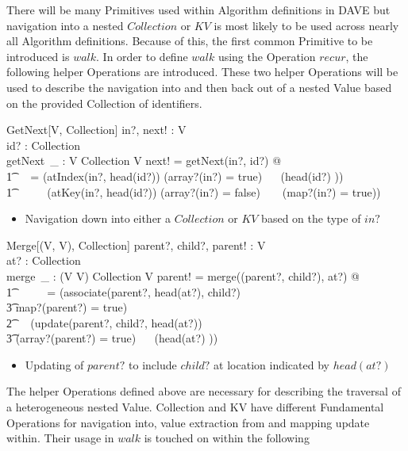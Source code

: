 \documentclass[../main.tex]{subfiles}
\begin{document}
There will be many Primitives used within Algorithm definitions in DAVE but
navigation into a nested $Collection$ or $KV$ is most likely to be used
across nearly all Algorithm definitions. Because of this, the first
common Primitive to be introduced is $walk$. In order to define $walk$
using the Operation $recur$, the following helper Operations are introduced.
These two helper Operations will be used to describe the navigation
into and then back out of a nested Value based on the provided
Collection of identifiers.
\begin{schema}{GetNext[V, Collection]}
  in?, next! : V \\
  id? : Collection \\
  getNext~\_ : V \cross Collection \surj V
  \where
  next! = getNext(in?, id?) @\\
  \t1 \ ~  = (atIndex(in?, head(id?)) \iff (array?(in?) = true) ~\land~ (head(id?) \in \nat)) ~\lor \\
  \t1 \ \ \ \ ~ (atKey(in?, head(id?)) \iff (array?(in?) = false) ~ \land ~ (map?(in?) = true))
\end{schema}
\begin{itemize}
  \item Navigation down into either a $Collection$ or $KV$ based on the type of $in?$
\end{itemize}
\begin{schema}{Merge[(V, V), Collection]}
  parent?, child?, parent! : V \\
  at? : Collection \\
  merge~\_ : (V \cross V) \cross Collection \bij V
  \where
  parent! = merge((parent?, child?), at?) @ \\
  \t1 \ \ \ \ ~ = (associate(parent?, head(at?), child?) \\
  \t3 \iff map?(parent?) = true) ~ \lor \\
  \t2 \ ~ (update(parent?, child?, head(at?)) \\
  \t3 \iff (array?(parent?) = true) ~\land~ (head(at?) \in \nat))
\end{schema}
\begin{itemize}
  \item Updating of $parent?$ to include $child?$ at location indicated by $head(at?)$
\end{itemize}
The helper Operations defined above are necessary for describing
the traversal of a heterogeneous nested Value. Collection and KV have
different Fundamental Operations for navigation into, value extraction from
and mapping update within. Their usage in $walk$ is touched on within the following
\end{document}
